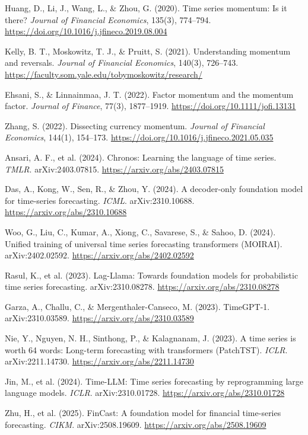 \documentclass[11pt,a4paper]{article}
\begin{document}
\begin{enumerate}[label={[\arabic*]},itemsep=2pt]
\item Huang, D., Li, J., Wang, L., \& Zhou, G. (2020). Time series momentum: Is it there? \emph{Journal of Financial Economics}, 135(3), 774--794. \url{https://doi.org/10.1016/j.jfineco.2019.08.004}
\item Kelly, B. T., Moskowitz, T. J., \& Pruitt, S. (2021). Understanding momentum and reversals. \emph{Journal of Financial Economics}, 140(3), 726--743. \url{https://faculty.som.yale.edu/tobymoskowitz/research/}
\item Ehsani, S., \& Linnainmaa, J. T. (2022). Factor momentum and the momentum factor. \emph{Journal of Finance}, 77(3), 1877--1919. \url{https://doi.org/10.1111/jofi.13131}
\item Zhang, S. (2022). Dissecting currency momentum. \emph{Journal of Financial Economics}, 144(1), 154--173. \url{https://doi.org/10.1016/j.jfineco.2021.05.035}
\item Ansari, A. F., et al. (2024). Chronos: Learning the language of time series. \emph{TMLR}. arXiv:2403.07815. \url{https://arxiv.org/abs/2403.07815}
\item Das, A., Kong, W., Sen, R., \& Zhou, Y. (2024). A decoder-only foundation model for time-series forecasting. \emph{ICML}. arXiv:2310.10688. \url{https://arxiv.org/abs/2310.10688}
\item Woo, G., Liu, C., Kumar, A., Xiong, C., Savarese, S., \& Sahoo, D. (2024). Unified training of universal time series forecasting transformers (MOIRAI). arXiv:2402.02592. \url{https://arxiv.org/abs/2402.02592}
\item Rasul, K., et al. (2023). Lag-Llama: Towards foundation models for probabilistic time series forecasting. arXiv:2310.08278. \url{https://arxiv.org/abs/2310.08278}
\item Garza, A., Challu, C., \& Mergenthaler-Canseco, M. (2023). TimeGPT-1. arXiv:2310.03589. \url{https://arxiv.org/abs/2310.03589}
\item Nie, Y., Nguyen, N. H., Sinthong, P., \& Kalagnanam, J. (2023). A time series is worth 64 words: Long-term forecasting with transformers (PatchTST). \emph{ICLR}. arXiv:2211.14730. \url{https://arxiv.org/abs/2211.14730}
\item Jin, M., et al. (2024). Time-LLM: Time series forecasting by reprogramming large language models. \emph{ICLR}. arXiv:2310.01728. \url{https://arxiv.org/abs/2310.01728}
\item Zhu, H., et al. (2025). FinCast: A foundation model for financial time-series forecasting. \emph{CIKM}. arXiv:2508.19609. \url{https://arxiv.org/abs/2508.19609}

\end{enumerate}
\end{document}
